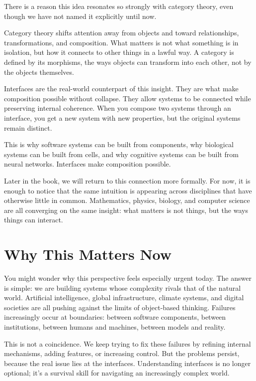 \documentclass[
  openright]{book}
\begin{document}
There is a reason this idea resonates so strongly with category theory,
even though we have not named it explicitly until now.

Category theory shifts attention away from objects and toward
relationships, transformations, and composition. What matters is not
what something is in isolation, but how it connects to other things in a
lawful way. A category is defined by its morphisms, the ways objects can
transform into each other, not by the objects themselves.

Interfaces are the real-world counterpart of this insight. They are what
make composition possible without collapse. They allow systems to be
connected while preserving internal coherence. When you compose two
systems through an interface, you get a new system with new properties,
but the original systems remain distinct.

This is why software systems can be built from components, why
biological systems can be built from cells, and why cognitive systems
can be built from neural networks. Interfaces make composition possible.

Later in the book, we will return to this connection more formally. For
now, it is enough to notice that the same intuition is appearing across
disciplines that have otherwise little in common. Mathematics, physics,
biology, and computer science are all converging on the same insight:
what matters is not things, but the ways things can interact.

\section{Why This Matters Now}\label{why-this-matters-now}

You might wonder why this perspective feels especially urgent today. The
answer is simple: we are building systems whose complexity rivals that
of the natural world. Artificial intelligence, global infrastructure,
climate systems, and digital societies are all pushing against the
limits of object-based thinking. Failures increasingly occur at
boundaries: between software components, between institutions, between
humans and machines, between models and reality.

This is not a coincidence. We keep trying to fix these failures by
refining internal mechanisms, adding features, or increasing control.
But the problems persist, because the real issue lies at the interfaces.
Understanding interfaces is no longer optional; it's a survival skill
for navigating an increasingly complex world.
\end{document}
